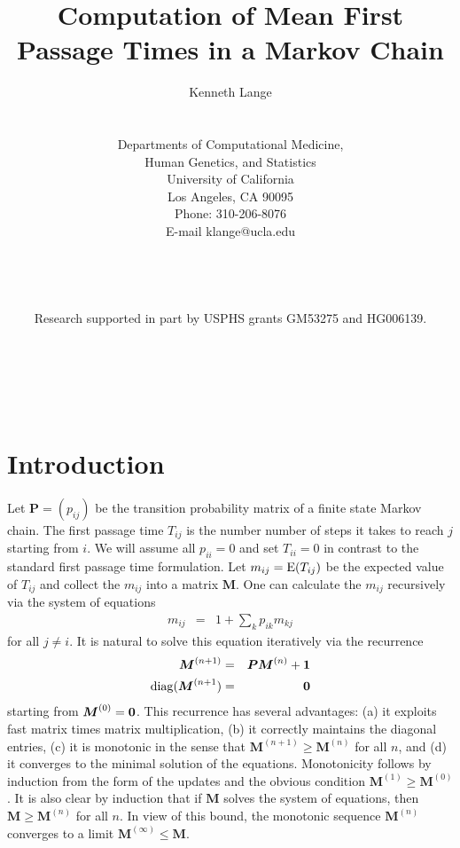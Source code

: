 \documentclass[11pt]{article}
\title{Computation of Mean First Passage Times in a Markov Chain}
\author{Kenneth Lange
\\
\\
\\
Departments of Computational Medicine, \\
Human Genetics, and Statistics \\
University of California \\
Los Angeles, CA 90095\\
Phone: 310-206-8076 \\
E-mail klange@ucla.edu \\
\\
\\
\\
\\
Research supported in part by USPHS grants GM53275 and HG006139.}
\newcommand{\lvskip}{\vspace{.5in}}
\def\E{\mathop{\rm E\,\!}\nolimits}
\def\diag{\mathop{\rm diag}\nolimits}
\newcommand{\bM}{\boldsymbol{M}}
\newcommand{\bP}{\boldsymbol{P}}
\begin{document}
\maketitle

\noindent  \\ \\
\lvskip


\newpage
{}

\baselineskip=20pt

\section*{\center Introduction}

Let $\bP=(p_{ij})$ be the transition probability matrix of a finite
state Markov chain. The first passage time $T_{ij}$ is the number
number of steps it takes to reach $j$ starting from $i$. We will
assume all $p_{ii} =0$ and set $T_{ii}=0$ in contrast to the standard first passage time formulation. Let $m_{ij}=\E(T_{ij})$ be the expected value of $T_{ij}$ and collect the $m_{ij}$
into a matrix $\bM$. One can calculate the $m_{ij}$ recursively via
the system of equations
\begin{eqnarray*}
m_{ij} & = & 1 + \sum_{k}p_{ik}m_{kj}
\end{eqnarray*}
for all $j\ne i$. It is natural to solve this equation iteratively via the recurrence
\begin{eqnarray*}
\bM^{(n+1)} & = & \bP\bM^{(n)} + {\bf 1} \\
\diag(\bM^{(n+1}) & = & {\bf 0}
\end{eqnarray*}
starting from $\bM^{(0)}={\bf 0}$. This recurrence has several
advantages: (a) it exploits fast matrix times matrix multiplication,
(b) it correctly maintains the diagonal entries, (c) it is monotonic in the sense that $\bM^{(n+1)} \ge \bM^{(n)}$ for all $n$, and (d) it converges to the minimal solution of the equations. Monotonicity follows by induction from the form of the updates and the
obvious condition $\bM^{(1)} \ge \bM^{(0)}$. It is also clear by induction that if $\bM$ solves the system of equations, then $\bM \ge \bM^{(n)}$ for all $n$. In view of this bound, the monotonic sequence 
$\bM^{(n)}$ converges to a limit $\bM^{(\infty)} \le \bM$.
\end{document}
